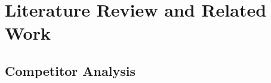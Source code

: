 \chapter{Literature Review and Related Work}
\label{chap:relatedworks}

\section{Competitor Analysis}
\label{section:competitor-analysis}

